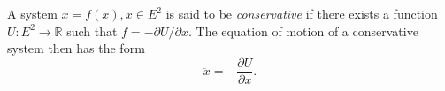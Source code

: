 A system $\ddot{x} = f(x), x \in E^2$ is said to be \textit{conservative} if there exists a function $U: E^2 \to \mathbb{R}$ such that $f = -\partial U / \partial x$.
The equation of motion of a conservative system then has the form
$$\ddot{x} = -\frac{\partial U}{\partial x}.$$
